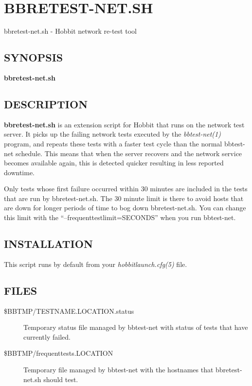 %
\newpage
\section{BBRETEST-NET.SH}

 bbretest-net.sh - Hobbit network re-test tool

 \subsection{SYNOPSIS}
\textbf{bbretest-net.sh}


 
\subsection{DESCRIPTION}
\textbf{bbretest-net.sh}
 is an extension script for Hobbit that runs on the network test
 server. It picks up the failing network tests executed by the
 \emph{bbtest-net(1)} program, and repeats these tests with a faster
 test cycle than the normal bbtest-net schedule. This means that when
 the server recovers and the network service becomes available again,
 this is detected quicker resulting in less reported downtime. 


  Only tests whose first failure occurred within 30 minutes are
  included in the tests that are run by bbretest-net.sh. The 30 minute
  limit is there to avoid hosts that are down for longer periods of
  time to bog down bbretest-net.sh. You can change this limit with the
  ``--frequenttestlimit=SECONDS'' when you run bbtest-net. 



 


 
\subsection{INSTALLATION}
 This script runs by default from your \emph{hobbitlaunch.cfg(5)}
 file. 

 


 
\subsection{FILES}
\begin{description}
\item[\$BBTMP/TESTNAME.LOCATION.status] Temporary status file managed
  by bbtest-net with status of tests that have currently failed. 

\item[\$BBTMP/frequenttests.LOCATION] Temporary file managed by
  bbtest-net with the hostnames that bbretest-net.sh should test. 


 


\end{description}
